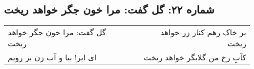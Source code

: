 \begin{center}
\section*{شماره ۲۲: گل گفت: مرا خون جگر خواهد ریخت}
\label{sec:022}
\begin{longtable}{l p{0.5cm} r}
گل گفت: مرا خون جگر خواهد ریخت
&&
بر خاک رهم کنار زر خواهد ریخت
\\
ای ابر! بیا و آب زن بر رویم
&&
کآبِ رخ من گلابگر خواهد ریخت
\\
\end{longtable}
\end{center}
